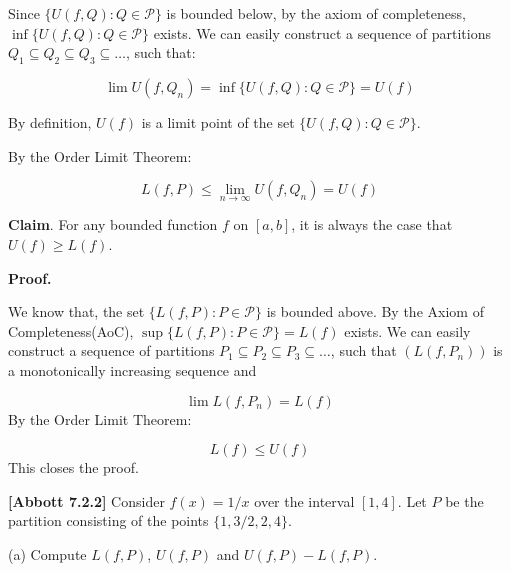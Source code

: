 \documentclass[10pt]{article}
\begin{document}
Since $\displaystyle \{U( f,Q) :Q\in \mathcal{P}\}$ is bounded below, by the axiom of completeness, $\displaystyle \inf\{U( f,Q) :Q\in \mathcal{P}\}$ exists. We can easily construct a sequence of partitions $\displaystyle Q_{1} \subseteq Q_{2} \subseteq Q_{3} \subseteq \dotsc $, such that:




\begin{equation*}
\lim U( f,Q_{n}) =\inf\{U( f,Q) :Q\in \mathcal{P}\} =U( f)
\end{equation*}


By definition, $\displaystyle U( f)$ is a limit point of the set $\displaystyle \{U( f,Q) :Q\in \mathcal{P}\}$.



By the Order Limit Theorem:


\begin{equation*}
L( f,P) \leq \lim _{n\rightarrow \infty } U( f,Q_{n}) =U( f)
\end{equation*}


\textbf{Claim}.\textbf{ }For any bounded function $\displaystyle f$ on $\displaystyle [ a,b]$, it is always the case that $\displaystyle U( f) \geq L( f)$.



\textbf{Proof.}



We know that, the set $\displaystyle \{L( f,P) :P\in \mathcal{P}\}$ is bounded above. By the Axiom of Completeness(AoC), $\displaystyle \sup \{L( f,P) :P\in \mathcal{P}\} =L( f)$ exists. We can easily construct a sequence of partitions $\displaystyle P_{1} \subseteq P_{2} \subseteq P_{3} \subseteq \dotsc $, such that $\displaystyle ( L( f,P_{n}))$ is a monotonically increasing sequence and 


\begin{equation*}
\lim L( f,P_{n}) =L( f)
\end{equation*}
By the Order Limit Theorem:


\begin{equation*}
L( f) \leq U( f)
\end{equation*}
This closes the proof.



\textbf{[Abbott 7.2.2]} Consider $\displaystyle f( x) =1/x$ over the interval $\displaystyle [ 1,4]$. Let $\displaystyle P$ be the partition consisting of the points $\displaystyle \{1,3/2,2,4\}$.



(a) Compute $\displaystyle L( f,P)$, $\displaystyle U( f,P)$ and $\displaystyle U( f,P) -L( f,P)$. 
\end{document}
